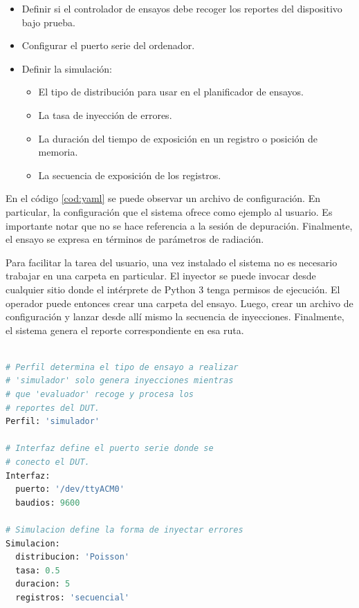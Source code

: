 \begin{itemize}
    \item Definir si el controlador de ensayos debe recoger los reportes del dispositivo bajo prueba.
    \item Configurar el puerto serie del ordenador.
    \item Definir la simulación:
        \begin{itemize}
            \item El tipo de distribución para usar en el planificador de ensayos.
            \item La tasa de inyección de errores.
            \item La duración del tiempo de exposición en un registro o posición de memoria.
            \item La secuencia de exposición de los registros.
        \end{itemize}
\end{itemize}


En el código \ref{cod:yaml} se puede observar un archivo de configuración.
En particular, la configuración que el sistema ofrece como ejemplo al usuario.
Es importante notar que no se hace referencia a la sesión de depuración.
Finalmente, el ensayo se expresa en términos de parámetros de radiación.

Para facilitar la tarea del usuario, una vez instalado el sistema no es necesario trabajar en una carpeta en particular.
El inyector se puede invocar desde cualquier sitio donde el intérprete de Python 3 tenga permisos de ejecución.
El operador puede entonces crear una carpeta del ensayo.
Luego, crear un archivo de configuración y lanzar desde allí mismo la secuencia de inyecciones.
Finalmente, el sistema genera el reporte correspondiente en esa ruta.

\begin{lstlisting}[language=Python,label=cod:yaml,caption=Ejemplo de configuración de ensayo.]  % Start your code-block

# Perfil determina el tipo de ensayo a realizar
# 'simulador' solo genera inyecciones mientras
# que 'evaluador' recoge y procesa los
# reportes del DUT.
Perfil: 'simulador'

# Interfaz define el puerto serie donde se
# conecto el DUT.
Interfaz:
  puerto: '/dev/ttyACM0'
  baudios: 9600

# Simulacion define la forma de inyectar errores
Simulacion:
  distribucion: 'Poisson'
  tasa: 0.5
  duracion: 5
  registros: 'secuencial'

\end{lstlisting}

